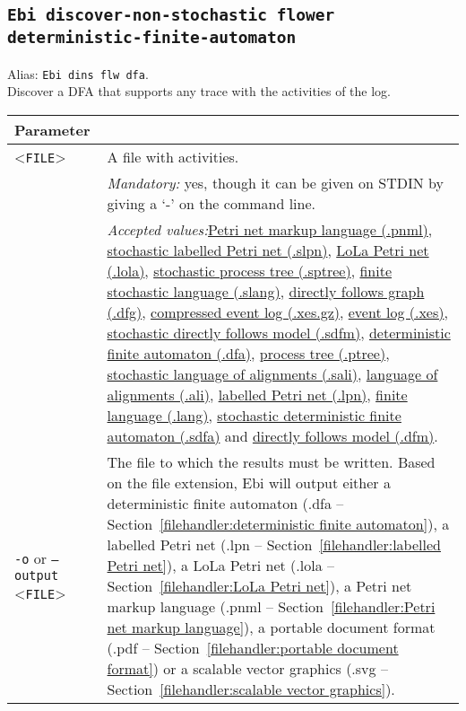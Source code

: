 {\subsection{\texttt{Ebi discover-non-stochastic flower deterministic-finite-automaton}}
\label{command:Ebi discover-non-stochastic flower deterministic-finite-automaton}
Alias: \texttt{Ebi dins flw dfa}.\\
Discover a DFA that supports any trace with the activities of the log.\\
\begin{tabularx}{\linewidth}{lX}
\toprule
Parameter \\\midrule
<\texttt{FILE}>&A file with activities.\\
&\textit{Mandatory:} \quad yes, though it can be given on STDIN by giving a `-' on the command line.\\
&\textit{Accepted values:}\quad \hyperref[filehandler:Petri net markup language]{Petri net markup language (.pnml)}, \hyperref[filehandler:stochastic labelled Petri net]{stochastic labelled Petri net (.slpn)}, \hyperref[filehandler:LoLa Petri net]{LoLa Petri net (.lola)}, \hyperref[filehandler:stochastic process tree]{stochastic process tree (.sptree)}, \hyperref[filehandler:finite stochastic language]{finite stochastic language (.slang)}, \hyperref[filehandler:directly follows graph]{directly follows graph (.dfg)}, \hyperref[filehandler:compressed event log]{compressed event log (.xes.gz)}, \hyperref[filehandler:event log]{event log (.xes)}, \hyperref[filehandler:stochastic directly follows model]{stochastic directly follows model (.sdfm)}, \hyperref[filehandler:deterministic finite automaton]{deterministic finite automaton (.dfa)}, \hyperref[filehandler:process tree]{process tree (.ptree)}, \hyperref[filehandler:stochastic language of alignments]{stochastic language of alignments (.sali)}, \hyperref[filehandler:language of alignments]{language of alignments (.ali)}, \hyperref[filehandler:labelled Petri net]{labelled Petri net (.lpn)}, \hyperref[filehandler:finite language]{finite language (.lang)}, \hyperref[filehandler:stochastic deterministic finite automaton]{stochastic deterministic finite automaton (.sdfa)} and \hyperref[filehandler:directly follows model]{directly follows model (.dfm)}.\\
\texttt{-o} or \texttt{--output} <\texttt{FILE}> &
The file to which the results must be written. Based on the file extension, Ebi will output either a deterministic finite automaton (.dfa -- Section~\ref{filehandler:deterministic finite automaton}), a labelled Petri net (.lpn -- Section~\ref{filehandler:labelled Petri net}), a LoLa Petri net (.lola -- Section~\ref{filehandler:LoLa Petri net}), a Petri net markup language (.pnml -- Section~\ref{filehandler:Petri net markup language}), a portable document format (.pdf -- Section~\ref{filehandler:portable document format}) or a scalable vector graphics (.svg -- Section~\ref{filehandler:scalable vector graphics}).

\end{tabularx}}
